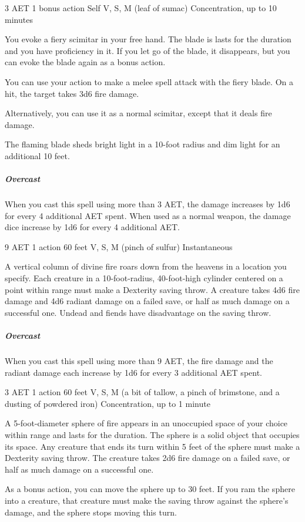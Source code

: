 {3 AET}
{1 bonus action}
{Self}
{V, S, M (leaf of sumac)}
{Concentration, up to 10 minutes}

You evoke a fiery scimitar in your free hand. The blade is lasts for the duration and you have proficiency in it. If you let go of the blade, it disappears, but you can evoke the blade again as a bonus action.

You can use your action to make a melee spell attack with the fiery blade. On a hit, the target takes 3d6 fire damage.

Alternatively, you can use it as a normal scimitar, except that it deals fire damage.

The flaming blade sheds bright light in a 10-foot radius and dim light for an additional 10 feet.

\subparagraph*{Overcast} When you cast this spell using more than 3 AET, the damage increases by 1d6 for every 4 additional AET spent. When used as a normal weapon, the damage dice increase by 1d6 for every 4 additional AET.


{9 AET}
{1 action}
{60 feet}
{V, S, M (pinch of sulfur)}
{Instantaneous}

A vertical column of divine fire roars down from the heavens in a location you specify. Each creature in a 10-foot-radius, 40-foot-high cylinder centered on a point within range must make a Dexterity saving throw. A creature takes 4d6 fire damage and 4d6 radiant damage on a failed save, or half as much damage on a successful one. Undead and fiends have disadvantage on the saving throw.

\subparagraph*{Overcast} When you cast this spell using more than 9 AET, the fire damage and the radiant damage each increase by 1d6 for every 3 additional AET spent.


{3 AET}
{1 action}
{60 feet}
{V, S, M (a bit of tallow, a pinch of brimstone, and a dusting of powdered iron)}
{Concentration, up to 1 minute}

A 5-foot-diameter sphere of fire appears in an unoccupied space of your choice within range and lasts for the duration. The sphere is a solid object that occupies its space. Any creature that ends its turn within 5 feet of the sphere must make a Dexterity saving throw. The creature takes 2d6 fire damage on a failed save, or half as much damage on a successful one.

As a bonus action, you can move the sphere up to 30 feet. If you ram the sphere into a creature, that creature must make the saving throw against the sphere's damage, and the sphere stops moving this turn.

